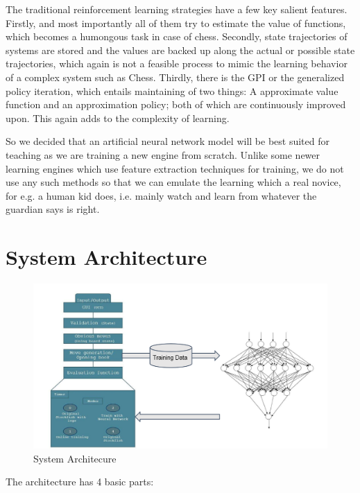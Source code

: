 \documentclass[a4paper,12pt,latin modern roman]{article}
\begin{document}
The traditional reinforcement learning strategies have a few key salient features. Firstly, and most importantly all of them try to estimate the value of functions, which becomes a humongous task in case of chess. Secondly, state trajectories of systems are stored and the values are backed up along the actual or possible state trajectories, which again is not a feasible process to mimic the learning behavior of a complex system such as Chess. Thirdly, there is the GPI or the generalized policy iteration, which entails maintaining of two things: A approximate value function and an approximation policy; both of which are continuously improved upon. This again adds to the complexity of learning. 

So we decided that an artificial neural network model will be best suited for teaching as we are training a new engine from scratch. Unlike some newer learning engines which use feature extraction techniques for training, we do not use any such methods so that we can emulate the learning which a real novice, for e.g. a human kid does, i.e. mainly watch and learn from whatever the guardian says is right.  

\section{System Architecture}


\begin{figure}[!ht]
\centering
    \includegraphics[width=\textwidth,height=\textheight,keepaspectratio]{SysArch.png}%
    \caption{System Architecure}

\end{figure}

The architecture has 4 basic parts:
\end{document}
